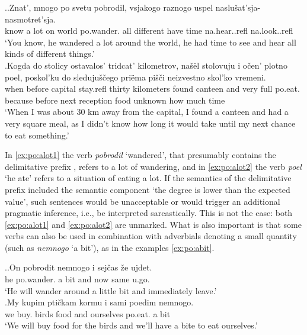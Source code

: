 \ex.\label{ex:po:alot}\ag.\label{ex:po:alot1}Znat', mnogo po svetu pobrodil, vsjakogo raznogo uspel {naslu\v{s}at'sja-} {nasmotret'sja.}\\
know {a lot} on world po.wander. all different {have time} na.hear..refl na.look..refl\\
\trans `You know, he wandered a lot around the world, he had time to see and hear all kinds of different things.'\\
\bg.\label{ex:po:alot2}Kogda do stolicy ostavalos' tridcat' kilometrov, na\v{s}\"{e}l stolovuju i o\v{c}en' plotno poel, poskol'ku do sleduju\v{s}\v{c}ego pri\"{e}ma pi\v{s}\v{c}i neizvestno skol'ko vremeni.\\
when before capital stay.refl thirty kilometers found canteen and very full po.eat. because before next reception food unknown {how much} time\\
\trans `When I was about 30 km away from the capital, I found a canteen and had a very square meal, as I didn't know how long it would take until my next chance to eat something.'\\

In \ref{ex:po:alot1} the verb \textit{pobrodil} `wandered', that presumably contains the delimitative prefix , refers to a lot of wandering, and in \ref{ex:po:alot2} the verb \textit{poel} `he ate' refers to a situation of eating a lot. If the semantics of the delimitative prefix  included the semantic component `the degree is lower than the expected value', such sentences would be unacceptable or would trigger an additional pragmatic inference, i.e., be interpreted sarcastically. This is not the case: both \ref{ex:po:alot1} and \ref{ex:po:alot2} are unmarked. What is also important is that some verbs can also be used in combination with adverbials denoting a small quantity (such as \textit{nemnogo} `a bit'), as in the examples \ref{ex:po:abit}.

\ex.\label{ex:po:abit}\ag.On pobrodit nemnogo i sej\v{c}as \v{z}e ujdet.\\
he po.wander. {a bit} and now same u.go.\\
\trans `He will wander around a little bit and immediately leave.'\\
\bg.My kupim pti\v{c}kam kormu i sami poedim nemnogo.\\
we buy. birds food and ourselves po.eat. {a bit}\\
\trans `We will buy food for the birds and we'll have a bite to eat ourselves.'\\

